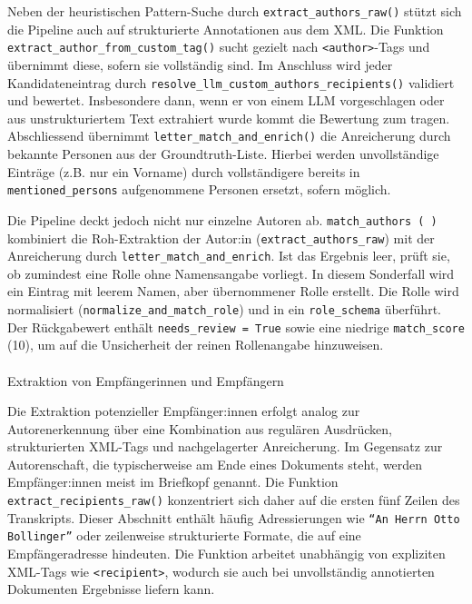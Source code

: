 \documentclass[12pt, a4paper, ngerman, bidi=default]{article}
\makeatletter
\newcommand{\code}[1]{\colorbox{VeryLightGray}{\texttt{#1}}} %
\let\oldparagraph\paragraph%
\renewcommand{\paragraph}{
    \@ifstar%
      \xxxParagraphStar%
      \xxxParagraphNoStar%
 }
\newcommand{\xxxParagraphStar}[1]{\oldparagraph*{#1}\mbox{}}
\newcommand{\xxxParagraphNoStar}[1]{\oldparagraph{#1}\mbox{}}
\makeatother
\begin{document}
Neben der heuristischen Pattern-Suche durch \code{extract\_authors\_raw()} stützt sich die Pipeline auch auf strukturierte Annotationen aus dem XML. Die Funktion \code{extract\_author\_from\_custom\_tag()} sucht gezielt nach \code{<author>}-Tags und übernimmt diese, sofern sie vollständig sind. Im Anschluss wird jeder Kandidateneintrag durch \code{resolve\_llm\_custom\_authors\_recipients()} validiert und bewertet. Insbesondere dann, wenn er von einem LLM vorgeschlagen oder aus unstrukturiertem Text extrahiert wurde kommt die Bewertung zum tragen. Abschliessend übernimmt \code{letter\_match\_and\_enrich()} die Anreicherung durch bekannte Personen aus der Groundtruth-Liste. Hierbei werden unvollständige Einträge (z.B. nur ein Vorname) durch vollständigere bereits in \code{mentioned\_persons} aufgenommene Personen ersetzt, sofern möglich. 

Die Pipeline deckt jedoch nicht nur einzelne Autoren ab. \code{match\_authors~(~)} kombiniert die Roh-Extraktion der Autor:in (\code{extract\_authors\_raw}) mit der Anreicherung durch \code{letter\_match\_and\_enrich}. Ist das Ergebnis leer, prüft sie, ob zumindest eine Rolle ohne Namensangabe vorliegt. In diesem Sonderfall wird ein Eintrag mit leerem Namen, aber übernommener Rolle erstellt. Die Rolle wird normalisiert (\code{normalize\_and\_match\_role}) und in ein \code{role\_schema} überführt. Der Rückgabewert enthält \code{needs\_review = True} sowie eine niedrige \code{match\_score} (10), um auf die Unsicherheit der reinen Rollenangabe hinzuweisen.


\paragraph{Extraktion von Empfängerinnen und Empfängern}

Die Extraktion potenzieller Empfänger:innen erfolgt analog zur Autorenerkennung über eine Kombination aus regulären Ausdrücken, strukturierten XML-Tags und nachgelagerter Anreicherung. Im Gegensatz zur Autorenschaft, die typischerweise am Ende eines Dokuments steht, werden Empfänger:innen meist im Briefkopf genannt. Die Funktion \code{extract\_recipients\_raw()} konzentriert sich daher auf die ersten fünf Zeilen des Transkripts. Dieser Abschnitt enthält häufig Adressierungen wie \texttt{\enquote{An Herrn Otto Bollinger}} oder zeilenweise strukturierte Formate, die auf eine Empfängeradresse hindeuten. Die Funktion arbeitet unabhängig von expliziten XML-Tags wie \code{<recipient>}, wodurch sie auch bei unvollständig annotierten Dokumenten Ergebnisse liefern kann.
\end{document}
